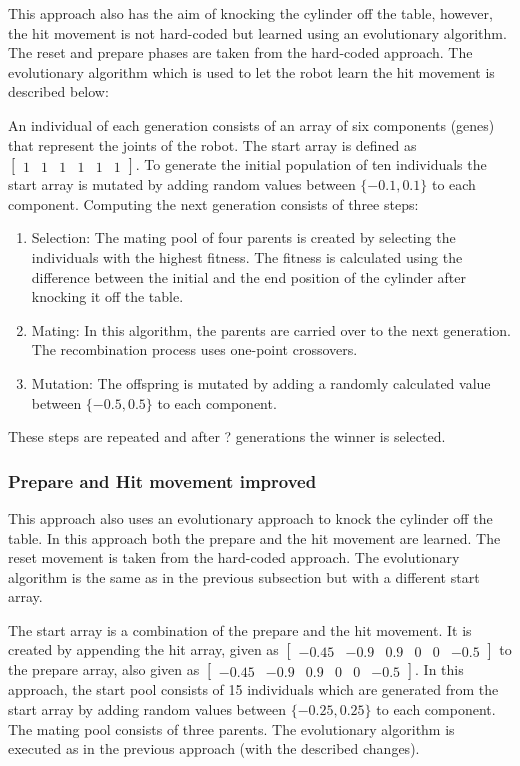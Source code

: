 This approach also has the aim of knocking the cylinder off the table, however, the hit movement is not hard-coded but learned using an evolutionary algorithm. The reset and prepare phases are taken from the hard-coded approach.
The evolutionary algorithm which is used to let the robot learn the hit movement is described below: 

An individual of each generation consists of an array of six components (genes) that represent the joints of the robot. The start array is defined as $\begin{bmatrix}
				1 & 1 & 1 & 1 & 1 & 1
				\end{bmatrix}$.
To generate the initial population of ten individuals the start array is mutated by adding random values between $\{-0.1,0.1\}$ to each component.
Computing the next generation consists of three steps:
\begin{enumerate}
\item Selection: The mating pool of four parents is created by selecting the individuals with the highest fitness. The fitness is calculated using the difference between the initial and the end position of the cylinder after knocking it off the table.

\item Mating: In this algorithm, the parents are carried over to the next generation. The recombination process uses one-point crossovers. 

\item Mutation: The offspring is mutated by adding a randomly calculated value between $\{-0.5,0.5\}$ to each component.
\end{enumerate}

These steps are repeated and after ? generations the winner is selected.

\subsubsection{Prepare and Hit movement improved} 

This approach also uses an evolutionary approach to knock the cylinder off the table. In this approach both the prepare and the hit movement are learned. The reset movement is taken from the hard-coded approach. The evolutionary algorithm is the same as in the previous subsection but with a different start array. 

The start array is a combination of the prepare and the hit movement. It is  created by appending the hit array, given as  
$\begin{bmatrix}
-0.45 &  -0.9 & 0.9 & 0 & 0 & -0.5
\end{bmatrix}$ 
to the prepare array, also given as
$\begin{bmatrix}
-0.45 &  -0.9 & 0.9 & 0 & 0 & -0.5
\end{bmatrix}$.
In this approach, the start pool consists of 15 individuals which are generated from the start array by adding random values between $\{-0.25,0.25\}$ to each component. The mating pool consists of three parents.
The evolutionary algorithm is executed as in the previous approach (with the described changes).

